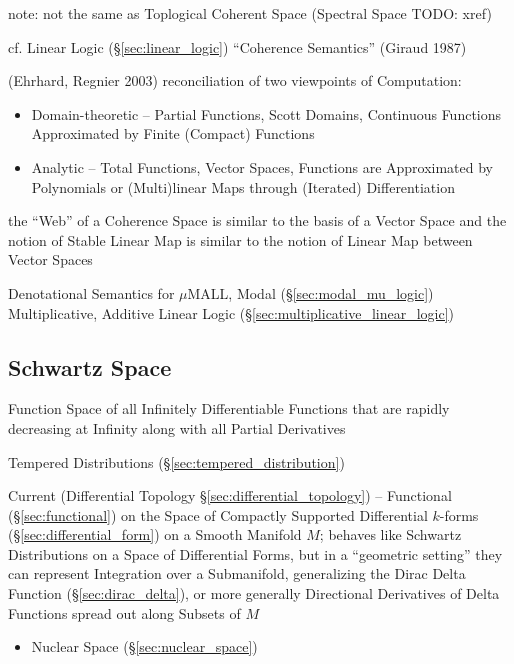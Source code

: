 
note: not the same as Toplogical Coherent Space (Spectral Space TODO: xref)

cf. Linear Logic (\S\ref{sec:linear_logic}) ``Coherence Semantics'' (Giraud
1987)

(Ehrhard, Regnier 2003) reconciliation of two viewpoints of Computation:
\begin{itemize}
  \item Domain-theoretic -- Partial Functions, Scott Domains, Continuous
    Functions Approximated by Finite (Compact) Functions
  \item Analytic -- Total Functions, Vector Spaces, Functions are Approximated
    by Polynomials or (Multi)linear Maps through (Iterated) Differentiation
\end{itemize}
the ``Web'' of a Coherence Space is similar to the basis of a Vector Space and
the notion of Stable Linear Map is similar to the notion of Linear Map between
Vector Spaces

Denotational Semantics for $\mu$MALL, Modal (\S\ref{sec:modal_mu_logic})
Multiplicative, Additive Linear Logic (\S\ref{sec:multiplicative_linear_logic})



\subsection{Schwartz Space}\label{sec:schwartz_space}

Function Space of all Infinitely Differentiable Functions that are rapidly
decreasing at Infinity along with all Partial Derivatives

\fist Tempered Distributions (\S\ref{sec:tempered_distribution})

Current (Differential Topology \S\ref{sec:differential_topology}) -- Functional
(\S\ref{sec:functional}) on the Space of Compactly Supported Differential
$k$-forms (\S\ref{sec:differential_form}) on a Smooth Manifold $M$; behaves like
Schwartz Distributions on a Space of Differential Forms, but in a ``geometric
setting'' they can represent Integration over a Submanifold, generalizing the
Dirac Delta Function (\S\ref{sec:dirac_delta}), or more generally Directional
Derivatives of Delta Functions spread out along Subsets of $M$

\begin{itemize}
  \item Nuclear Space (\S\ref{sec:nuclear_space})
\end{itemize}




